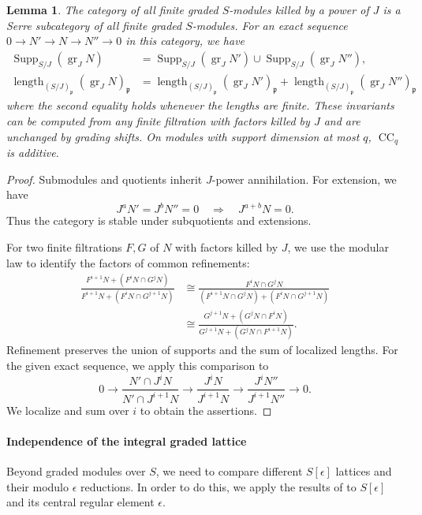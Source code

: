 \documentclass[11pt]{article}
\newtheorem{lemma}[theorem]{Lemma}
\theoremstyle{definition}
\newcommand{\gr}{\operatorname{gr}}
\newcommand{\CC}{\operatorname{CC}}
\newcommand{\Supp}{\operatorname{Supp}}
\newcommand{\length}{\operatorname{length}}
\begin{document}
\begin{lemma}\label{lem:local-length}
The category of all finite graded $S$-modules killed by a power of $J$ is a Serre
subcategory of all finite graded $S$-modules. For an exact sequence $0\to N'\to N\to N''\to0$ in this category, we have
\[
 \begin{aligned}
 \Supp_{S/J}(\gr_JN)
 &=\Supp_{S/J}(\gr_JN')\cup\Supp_{S/J}(\gr_JN''),\\
 \length_{(S/J)_{\mathfrak p}}(\gr_JN)_{\mathfrak p}
 &=\length_{(S/J)_{\mathfrak p}}(\gr_JN')_{\mathfrak p}
  +\length_{(S/J)_{\mathfrak p}}(\gr_JN'')_{\mathfrak p}
 \end{aligned}
\]
where the second equality holds whenever the lengths are finite.
These invariants can be computed from any finite filtration with factors killed by $J$ and
are unchanged by grading shifts. On modules with support dimension at most $q$,
$\CC_q$ is additive.
\end{lemma}
\begin{proof}
Submodules and quotients inherit $J$-power annihilation. For extension, we have
\[
 J^aN'=J^bN''=0\quad\Rightarrow\quad J^{a+b}N=0.
\]Thus the category is stable under subquotients and extensions. 

For two finite filtrations $F,G$ of $N$ with factors killed by $J$,
we use the modular law to identify the factors of common refinements:
\[
 \begin{aligned}
 \frac{F^{i+1}N+(F^iN\cap G^jN)}
      {F^{i+1}N+(F^iN\cap G^{j+1}N)}
 &\cong
 \frac{F^iN\cap G^jN}
      {(F^{i+1}N\cap G^jN)+(F^iN\cap G^{j+1}N)}\\
 &\cong
 \frac{G^{j+1}N+(G^jN\cap F^iN)}
      {G^{j+1}N+(G^jN\cap F^{i+1}N)}.
 \end{aligned}
\]
Refinement preserves the union of supports and the sum of localized
lengths. For the given exact sequence, we apply this comparison to
\[
 0\longrightarrow\frac{N'\cap J^iN}{N'\cap J^{i+1}N}
 \longrightarrow\frac{J^iN}{J^{i+1}N}
 \longrightarrow\frac{J^iN''}{J^{i+1}N''}
 \longrightarrow0.
\]
We localize and sum over $i$ to obtain the assertions.
\end{proof}

\paragraph{Independence of the integral graded lattice}
\label{sec:lattices}
Beyond graded modules over $S$, we need to compare different $S[\epsilon]$ lattices and their modulo $\epsilon$ reductions.
In order to do this, we apply the results of \cite[Theorem~1.1.17 and Corollary~1.1.18]{Ginzburg1998}
to $S[\epsilon]$ and its central regular element $\epsilon$.
\end{document}
